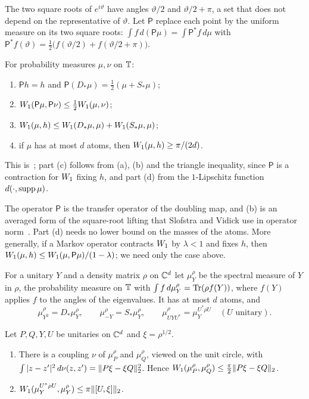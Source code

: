 The two square roots of $e^{i\vartheta}$ have angles $\vartheta/2$ and $\vartheta/2+\pi$, a set that does not depend on the
representative of $\vartheta$. Let $\mathsf P$ replace each point by the uniform measure on its two square roots:
$\int f\,d(\mathsf P\mu)=\int\mathsf P^*f\,d\mu$ with $\mathsf P^*f(\vartheta)=\frac12\bigl(f(\vartheta/2)+f(\vartheta/2+\pi)\bigr)$.

\begin{lemma}\label{lem:circle}
For probability measures $\mu,\nu$ on $\mathbb T$:
\begin{enumerate}[label=(\alph*),itemsep=1pt]
\item $\mathsf Ph=h$ and $\mathsf P(D_*\mu)=\frac12(\mu+S_*\mu)$;
\item $W_1(\mathsf P\mu,\mathsf P\nu)\le\frac12W_1(\mu,\nu)$;
\item $W_1(\mu,h)\le W_1(D_*\mu,\mu)+W_1(S_*\mu,\mu)$;
\item if $\mu$ has at most $d$ atoms, then $W_1(\mu,h)\ge\pi/(2d)$.
\end{enumerate}
\end{lemma}

This is~\cite[Lemma~11.7]{DM-game}; part (c) follows from (a), (b) and the triangle inequality, since $\mathsf P$ is a
contraction for $W_1$ fixing $h$, and part (d) from the $1$-Lipschitz function $d(\cdot,\operatorname{supp}\mu)$.

The operator $\mathsf P$ is the transfer operator of the doubling map, and (b) is an averaged form of the
square-root lifting that Slofstra and Vidick use in operator norm~\cite[Claims~3.6 and~3.7]{SV18}. Part (d) needs no
lower bound on the masses of the atoms. More generally, if a Markov operator contracts $W_1$ by $\lambda<1$ and fixes
$h$, then $W_1(\mu,h)\le W_1(\mu,\mathsf P\mu)/(1-\lambda)$; we need only the case above.

For a unitary $Y$ and a density matrix $\rho$ on $\mathbb C^d$ let $\mu^\rho_Y$ be the spectral measure of $Y$ in $\rho$, the
probability measure on $\mathbb T$ with $\int f\,d\mu^\rho_Y=\operatorname{Tr}(\rho f(Y))$, where $f(Y)$ applies $f$ to the angles of the
eigenvalues. It has at most $d$ atoms, and
\begin{equation}\label{eq:spectral-push}
\mu^\rho_{Y^2}=D_*\mu^\rho_Y,\qquad\mu^\rho_{-Y}=S_*\mu^\rho_Y,\qquad\mu^\rho_{UYU^*}=\mu^{U^*\rho U}_Y\quad(U\text{ unitary}).
\end{equation}

\begin{lemma}\label{lem:spectral-coupling}
Let $P,Q,Y,U$ be unitaries on $\mathbb C^d$ and $\xi=\rho^{1/2}$.
\begin{enumerate}[label=(\alph*),itemsep=1pt]
\item There is a coupling $\nu$ of $\mu^\rho_P$ and $\mu^\rho_Q$, viewed on the unit circle, with
$\int|z-z'|^2\,d\nu(z,z')=\lVert P\xi-\xi Q\rVert_2^2$. Hence $W_1(\mu^\rho_P,\mu^\rho_Q)\le\frac\pi2\lVert P\xi-\xi Q\rVert_2$.
\item $W_1(\mu^{U^*\rho U}_Y,\mu^\rho_Y)\le\pi\lVert [U,\xi]\rVert_2$.
\end{enumerate}
\end{lemma}

